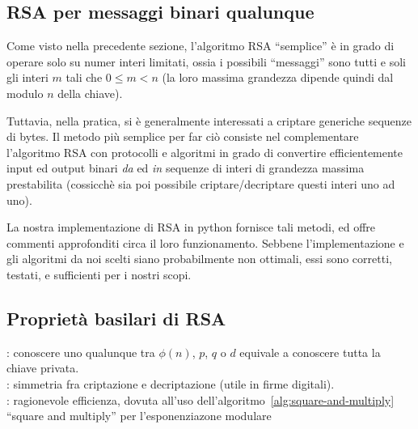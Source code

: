\documentclass[pdflatex,11pt,a4paper,oneside]{article}
\let\OldEmph\emph
\renewcommand{\emph}[1]{\OldEmph{#1\/}}
\newcommand{\XXX}[1][XXX]{\text{\bfseries{\color{red}{\emph{#1}}}}}
\newcommand{\TODO}[0]{\XXX[TODO]}
\newcommand{\p}[1]{\left({#1}\right)}
\newcommand{\ephi}[1]{\ensuremath{\phi\p{#1}}}
\begin{document}
\subsection{RSA per messaggi binari qualunque}

Come visto nella precedente sezione, l'algoritmo RSA ``semplice'' \`e
in grado di operare solo su numer interi limitati, ossia i possibili
``messaggi'' sono tutti e soli gli interi $m$ tali che $0 \leq m < n$
(la loro massima grandezza dipende quindi dal modulo $n$ della chiave).

Tuttavia, nella pratica, si \`e generalmente interessati a criptare
generiche sequenze di bytes.  Il metodo pi\`u semplice per far ci\`o
consiste nel complementare l'algoritmo RSA con protocolli e algoritmi
in grado di convertire efficientemente input ed output binari \emph{da}
ed \emph{in} sequenze di interi di grandezza massima prestabilita
(cossicch\`e sia poi possibile criptare/decriptare questi interi uno
ad uno).

La nostra implementazione di RSA in python fornisce tali metodi, ed
offre commenti approfonditi circa il loro funzionamento. Sebbene
l'implementazione e gli algoritmi da noi scelti siano probabilmente
non ottimali, essi sono corretti, testati, e sufficienti per i nostri
scopi.

\subsection{Propriet\`a basilari di RSA}\label{subset:rsa-properties}

\TODO: conoscere uno qualunque tra $\ephi{n}$, $p$, $q$ o $d$ equivale
a conoscere tutta la chiave privata.
\\
\TODO: simmetria fra criptazione e decriptazione (utile in firme digitali).
\\
\TODO: ragionevole efficienza, dovuta all'uso
       dell'algoritmo~\eqref{alg:square-and-multiply}
       ``square and multiply'' per l'esponenziazone modulare
\end{document}
